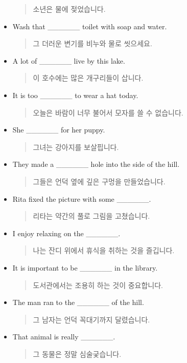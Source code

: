 \documentclass{article}
\begin{document}
\begin{addmargin}[1em]{1em}
\begin{itemize}
    \begin{quote}
    소년은 물에 젖었습니다.
    \end{quote}
    \item Wash that \_\_\_\_\_\_ toilet with soap and water.
    \begin{quote}
    그 더러운 변기를 비누와 물로 씻으세요.
    \end{quote}
    \item A lot of \_\_\_\_\_\_ live by this lake.
    \begin{quote}
    이 호수에는 많은 개구리들이 삽니다.
    \end{quote}
    \item It is too \_\_\_\_\_\_ to wear a hat today.
    \begin{quote}
    오늘은 바람이 너무 불어서 모자를 쓸 수 없습니다.
    \end{quote}
    \newpage
    \item She \_\_\_\_\_\_ for her puppy.
    \begin{quote}
    그녀는 강아지를 보살핍니다.
    \end{quote}
    \item They made a \_\_\_\_\_\_ hole into the side of the hill.
    \begin{quote}
    그들은 언덕 옆에 깊은 구멍을 만들었습니다.
    \end{quote}
    \item Rita fixed the picture with some \_\_\_\_\_\_.
    \begin{quote}
    리타는 약간의 풀로 그림을 고쳤습니다.
    \end{quote}
    \item I enjoy relaxing on the \_\_\_\_\_\_.
    \begin{quote}
    나는 잔디 위에서 휴식을 취하는 것을 즐깁니다.
    \end{quote}
    \item It is important to be \_\_\_\_\_\_ in the library.
    \begin{quote}
    도서관에서는 조용히 하는 것이 중요합니다.
    \end{quote}
    \item The man ran to the \_\_\_\_\_\_ of the hill.
    \begin{quote}
    그 남자는 언덕 꼭대기까지 달렸습니다.
    \end{quote}
    \item That animal is really \_\_\_\_\_\_.
    \begin{quote}
    그 동물은 정말 심술궂습니다.
    \end{quote}
\end{itemize}
\end{addmargin}
\end{document}
